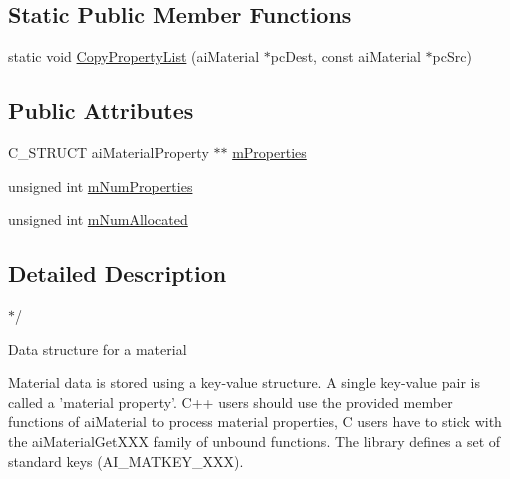 \subsection*{Static Public Member Functions}
\begin{DoxyCompactItemize}
\item 
static void \hyperlink{structendif_af2407ec9a1f919efc36017bb1c414841}{Copy\-Property\-List} (ai\-Material $\ast$pc\-Dest, const ai\-Material $\ast$pc\-Src)
\end{DoxyCompactItemize}
\subsection*{Public Attributes}
\begin{DoxyCompactItemize}
\item 
C\-\_\-\-S\-T\-R\-U\-C\-T ai\-Material\-Property $\ast$$\ast$ \hyperlink{structendif_a95295db8cbd37f02553457d84d65068a}{m\-Properties}
\item 
unsigned int \hyperlink{structendif_a751ff065f0b034cfd9cd08d7bc41d668}{m\-Num\-Properties}
\item 
unsigned int \hyperlink{structendif_add50ca52ed05564f2187b9893fb1f584}{m\-Num\-Allocated}
\end{DoxyCompactItemize}


\subsection{Detailed Description}
$\ast$/ 

Data structure for a material

Material data is stored using a key-\/value structure. A single key-\/value pair is called a 'material property'. C++ users should use the provided member functions of ai\-Material to process material properties, C users have to stick with the ai\-Material\-Get\-X\-X\-X family of unbound functions. The library defines a set of standard keys (A\-I\-\_\-\-M\-A\-T\-K\-E\-Y\-\_\-\-X\-X\-X). 

